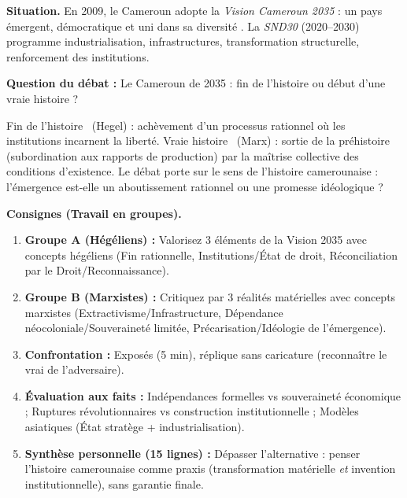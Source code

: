 \documentclass[11pt]{article}
\newcommand{\cle}[1]{{\popxbold\color{popdark}#1}}
\begin{document}
\begin{experience}
\textbf{Situation.} En 2009, le Cameroun adopte la \emph{Vision Cameroun 2035} : \guillemotleft un pays émergent, démocratique et uni dans sa diversité \guillemotright. La \emph{SND30} (2020--2030) programme industrialisation, infrastructures, transformation structurelle, renforcement des institutions.

\textbf{Question du débat :} \guillemotleft Le Cameroun de 2035 : fin de l'histoire ou début d'une vraie histoire ? \guillemotright

\begin{attention}
\guillemotleft Fin de l'histoire \guillemotright\ (Hegel) : achèvement d'un processus rationnel où les institutions incarnent la liberté. \guillemotleft Vraie histoire \guillemotright\ (Marx) : sortie de la préhistoire (subordination aux rapports de production) par la maîtrise collective des conditions d'existence. Le débat porte sur le \cle{sens de l'histoire} camerounaise : l'émergence est-elle un aboutissement rationnel ou une promesse idéologique ?
\end{attention}

\textbf{Consignes (Travail en groupes).}
\begin{enumerate}
\item \textbf{Groupe A (Hégéliens) :} Valorisez 3 éléments de la Vision 2035 avec concepts hégéliens (Fin rationnelle, Institutions/État de droit, Réconciliation par le Droit/Reconnaissance).
\item \textbf{Groupe B (Marxistes) :} Critiquez par 3 réalités matérielles avec concepts marxistes (Extractivisme/Infrastructure, Dépendance néocoloniale/Souveraineté limitée, Précarisation/Idéologie de l'émergence).
\item \textbf{Confrontation :} Exposés (5 min), réplique sans caricature (reconnaître le vrai de l'adversaire).
\item \textbf{Évaluation aux faits :} Indépendances formelles vs souveraineté économique ; Ruptures révolutionnaires vs construction institutionnelle ; Modèles asiatiques (État stratège + industrialisation).
\item \textbf{Synthèse personnelle (15 lignes) :} Dépasser l'alternative : penser l'histoire camerounaise comme \cle{praxis} (transformation matérielle \emph{et} invention institutionnelle), sans garantie finale.
\end{enumerate}
\end{experience}
\end{document}
